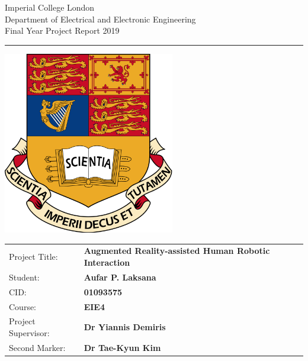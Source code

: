 \begin{titlepage}
	\setlength{\parindent}{0pt}
	\setlength{\parskip}{0pt}
	
	{
		\Large
		\raggedright
		Imperial College London\\[17pt]
		Department of Electrical and Electronic Engineering\\[17pt]
		Final Year Project Report 2019\\[17pt]
		
	}
	
	\rule{\columnwidth}{3pt}
	\vfill
	\centering
	\includegraphics[width=0.7\columnwidth,height=80mm,keepaspectratio]{img/crest.png}
	\vfill
	\setlength{\tabcolsep}{0pt}
	
	\begin{tabular}{p{40mm}p{\dimexpr\columnwidth-40mm}}
		Project Title: & \textbf{Augmented Reality-assisted Human Robotic Interaction} \\[12pt]
		Student: & \textbf{Aufar P. Laksana} \\[12pt]
		CID: & \textbf{01093575} \\[12pt]
		Course: & \textbf{EIE4} \\[12pt]
		Project Supervisor: & \textbf{Dr Yiannis Demiris} \\[12pt]
		Second Marker: & \textbf{Dr Tae-Kyun Kim} \\
	\end{tabular}
\end{titlepage}